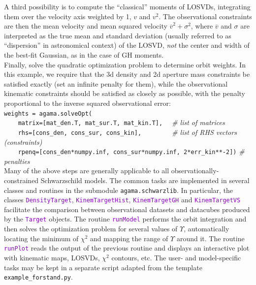 \documentclass[12pt]{article}
\newcommand{\ttt}[1]{\textcolor{darkviolet}{\texttt{#1}}}
\begin{document}
A third possibility is to compute the ``classical'' moments of LOSVDs, integrating them over the velocity axis weighted by 1, $v$ and $v^2$.
The observational constraints are then the mean velocity and mean squared velocity ${\overline v}^2 + \sigma^2$, where $\overline v$ and $\sigma$ are interpreted as the true mean and standard deviation (usually referred to as ``dispersion'' in astronomical context) of the LOSVD, \textit{not} the center and width of the best-fit Gaussian, as in the case of GH moments.\\[2mm]
Finally, solve the quadratic optimization problem to determine orbit weights. In this example, we require that the 3d density and 2d aperture mass constraints be satisfied exactly (set an infinite penalty for them), while the observational kinematic constraints should be satisfied as closely as possible, with the penalty proportional to the inverse squared observational error:\\[2mm]
\texttt{weights = agama.solveOpt(\\
\mbox{}~~~~matrix=[mat_den.T, mat_sur.T, mat_kin.T],}
\textit{\color{Sepia} \ \ \# list of matrices}\\
\texttt{\mbox{}~~~~rhs=[cons_den, cons_sur, cons_kin],~~~~~~\mbox{}}
\textit{\color{Sepia} \ \ \# list of RHS vectors (constraints)}\\
\texttt{\mbox{}~~~~rpenq=[cons_den*numpy.inf, cons_sur*numpy.inf, 2*err_kin**-2])}
\textit{\color{Sepia}\# penalties}\\[3mm]
Many of the above steps are generally applicable to all observationally-constrained Schwarzschild models. The common tasks are implemented in several classes and routines in the submodule \texttt{agama.schwarzlib}. In particular, the classes \ttt{DensityTarget}, \ttt{KinemTargetHist}, \ttt{KinemTargetGH} and \ttt{KinemTargetVS} facilitate the comparison between observational datasets and datacubes produced by the \ttt{Target} objects. The routine \ttt{runModel} performs the orbit integration and then solves the optimization problem for several values of $\Upsilon$, automatically locating the minimum of $\chi^2$ and mapping the range of $\Upsilon$ around it. The routine \ttt{runPlot} reads the output of the previous routine and displays an interactive plot with kinematic maps, LOSVDs, $\chi^2$ contours, etc. The user- and model-specific tasks may be kept in a separate script adapted from the template \texttt{example_forstand.py}.


\newpage
{}
\end{document}
